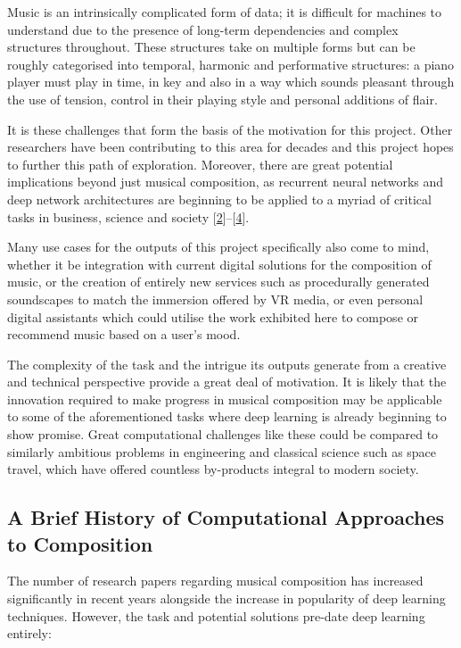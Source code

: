 \documentclass[12pt,]{article}
\begin{document}
Music is an intrinsically complicated form of data; it is difficult for
machines to understand due to the presence of long-term dependencies and
complex structures throughout. These structures take on multiple forms
but can be roughly categorised into temporal, harmonic and performative
structures: a piano player must play in time, in key and also in a way
which sounds pleasant through the use of tension, control in their
playing style and personal additions of flair.

It is these challenges that form the basis of the motivation for this
project. Other researchers have been contributing to this area for
decades and this project hopes to further this path of exploration.
Moreover, there are great potential implications beyond just musical
composition, as recurrent neural networks and deep network architectures
are beginning to be applied to a myriad of critical tasks in business,
science and society
{[}\protect\hyperlink{ref-deng2014deep}{2}{]}--{[}\protect\hyperlink{ref-goodfellow2016deep}{4}{]}.

Many use cases for the outputs of this project specifically also come to
mind, whether it be integration with current digital solutions for the
composition of music, or the creation of entirely new services such as
procedurally generated soundscapes to match the immersion offered by VR
media, or even personal digital assistants which could utilise the work
exhibited here to compose or recommend music based on a user's mood.

The complexity of the task and the intrigue its outputs generate from a
creative and technical perspective provide a great deal of motivation.
It is likely that the innovation required to make progress in musical
composition may be applicable to some of the aforementioned tasks where
deep learning is already beginning to show promise. Great computational
challenges like these could be compared to similarly ambitious problems
in engineering and classical science such as space travel, which have
offered countless by-products integral to modern society.

\hypertarget{a-brief-history-of-computational-approaches-to-composition}{%
\subsection{A Brief History of Computational Approaches to
Composition}\label{a-brief-history-of-computational-approaches-to-composition}}

The number of research papers regarding musical composition has
increased significantly in recent years alongside the increase in
popularity of deep learning techniques. However, the task and potential
solutions pre-date deep learning entirely:
\end{document}
